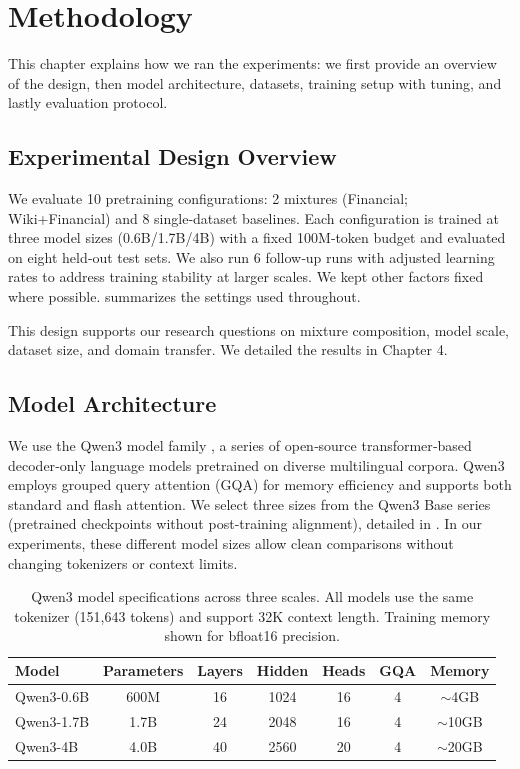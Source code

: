 \chapter{Methodology}

This chapter explains how we ran the experiments: we first provide an overview of the design, then model architecture, datasets, training setup with tuning, and lastly evaluation protocol.

\section{Experimental Design Overview}

We evaluate 10 pretraining configurations: 2 mixtures (Financial; Wiki+Financial) and 8 single‑dataset baselines. Each configuration is trained at three model sizes (0.6B/1.7B/4B) with a fixed 100M‑token budget and evaluated on eight held‑out test sets. We also run 6 follow‑up runs with adjusted learning rates to address training stability at larger scales. We kept other factors fixed where possible.  summarizes the settings used throughout.



This design supports our research questions on mixture composition, model scale, dataset size, and domain transfer. We detailed the results in Chapter 4.

\section{Model Architecture}

We use the Qwen3 model family \parencite{yang2024qwen2,qwen3}, a series of open‑source transformer‑based decoder‑only language models pretrained on diverse multilingual corpora. Qwen3 employs grouped query attention (GQA) for memory efficiency and supports both standard and flash attention. We select three sizes from the Qwen3 Base series (pretrained checkpoints without post‑training alignment), detailed in . In our experiments, these different model sizes allow clean comparisons without changing tokenizers or context limits.

\begin{table}[h]
\centering
\caption[Qwen3 Model Specifications]{Qwen3 model specifications across three scales. All models use the same tokenizer (151,643 tokens) and support 32K context length. Training memory shown for bfloat16 precision.}
\label{tab:model_specs}
\begin{tabular}{lcccccc}
\toprule
\textbf{Model} & \textbf{Parameters} & \textbf{Layers} & \textbf{Hidden} & \textbf{Heads} & \textbf{GQA} & \textbf{Memory} \\
\midrule
Qwen3-0.6B & 600M & 16 & 1024 & 16 & 4 & $\sim$4GB \\
Qwen3-1.7B & 1.7B & 24 & 2048 & 16 & 4 & $\sim$10GB \\
Qwen3-4B & 4.0B & 40 & 2560 & 20 & 4 & $\sim$20GB \\
\bottomrule
\end{tabular}
\end{table}

